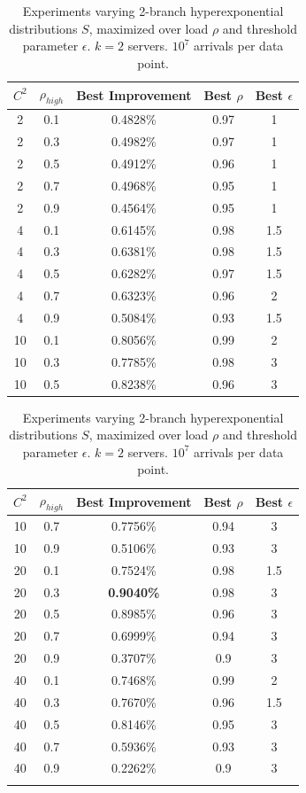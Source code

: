 \documentclass[acmsmall]{acmart}
\begin{document}
\begin{table}
    \centering
\begin{minipage}{0.48\textwidth}
\begin{tabular}{c|c||c|c|c}
$C^2$ & $\rho_{high}$ & Best Improvement & Best $\rho$ & Best $\epsilon$ \\
\hline
2& 0.1& 0.4828\%& 0.97& 1 \\
2& 0.3& 0.4982\%& 0.97& 1 \\
2& 0.5& 0.4912\%& 0.96& 1 \\
2& 0.7& 0.4968\%& 0.95& 1 \\
2& 0.9& 0.4564\%& 0.95& 1 \\
4& 0.1& 0.6145\%& 0.98& 1.5 \\
4& 0.3& 0.6381\%& 0.98& 1.5 \\
4& 0.5& 0.6282\%& 0.97& 1.5 \\
4& 0.7& 0.6323\%& 0.96& 2 \\
4& 0.9& 0.5084\%& 0.93& 1.5 \\
10& 0.1& 0.8056\%& 0.99& 2 \\
10& 0.3& 0.7785\%& 0.98& 3 \\
10& 0.5& 0.8238\%& 0.96& 3 \\
\end{tabular}
\end{minipage}
\hfill
\begin{minipage}{0.48\textwidth}
\begin{tabular}{|c|c||c|c|c}
$C^2$ & $\rho_{high}$ & Best Improvement & Best $\rho$ & Best $\epsilon$ \\
\hline
10& 0.7& 0.7756\%& 0.94& 3 \\
10& 0.9& 0.5106\%& 0.93& 3 \\
20& 0.1& 0.7524\%& 0.98& 1.5 \\
20& 0.3& \textbf{0.9040\%}& 0.98& 3 \\
20& 0.5& 0.8985\%& 0.96& 3 \\
20& 0.7& 0.6999\%& 0.94& 3 \\
20& 0.9& 0.3707\%& 0.9& 3 \\
40& 0.1& 0.7468\%& 0.99& 2 \\
40& 0.3& 0.7670\%& 0.96& 1.5 \\
40& 0.5& 0.8146\%& 0.95& 3 \\
40& 0.7& 0.5936\%& 0.93& 3 \\
40& 0.9& 0.2262\%& 0.9& 3 \\ \\
    \end{tabular}
\end{minipage}
\caption{Experiments varying 2-branch hyperexponential distributions $S$, maximized over load $\rho$ and threshold parameter $\epsilon$. $k=2$ servers. $10^7$ arrivals per data point.}
\label{tbl:explore-dists}
\end{table}
\end{document}
